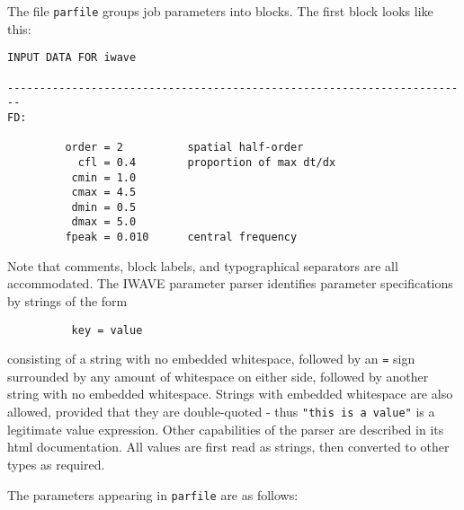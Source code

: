 The file {\tt parfile} groups job parameters into blocks. The first
block looks like this:
\begin{verbatim}
INPUT DATA FOR iwave

------------------------------------------------------------------------
FD:

         order = 2          spatial half-order
           cfl = 0.4        proportion of max dt/dx
          cmin = 1.0
          cmax = 4.5
          dmin = 0.5
          dmax = 5.0
         fpeak = 0.010      central frequency

\end{verbatim}
Note that comments, block labels, and typographical separators are all
accommodated. The IWAVE parameter parser identifies parameter
specifications by strings of the form 
\begin{verbatim}
          key = value
\end{verbatim}
consisting of a string with no embedded whitespace, followed by an
{\tt =} sign surrounded by any amount of whitespace on either side,
followed by another string with no embedded whitespace. Strings with embedded
whitespace are also allowed, provided that they are double-quoted -
thus {\tt "this is a value"} is a legitimate value expression. Other
capabilities of the parser are described in its html
documentation. All values are first read as strings, then
converted to other types as required.

The parameters appearing in {\tt parfile} are as follows:

